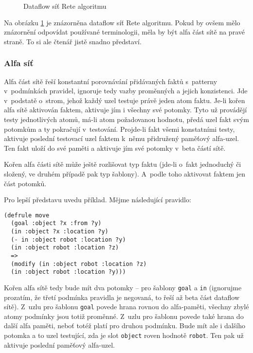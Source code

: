 \begin{figure}[h]
\centerline{}
\caption{Dataflow síť Rete algoritmu\cite{rete}}
\label{network}
\end{figure}

Na obrázku \ref{network} je znázorněna dataflow síť Rete algoritmu.
Pokud by ovšem mělo znázornění odpovídat používané terminologii, měla
by být alfa část sítě na pravé straně. To si ale čtenář jistě snadno
představí.
\subsubsection{Alfa síť}
Alfa část sítě řeší konstantní porovnávání přidávaných faktů s~patterny
v~podmínkách pravidel, ignoruje tedy vazby proměnných a jejich konzistenci.
Jde v~podstatě o~strom, jehož každý uzel testuje právě jeden atom faktu.
Je-li kořen alfa sítě aktivován faktem, aktivuje jím i všechny své potomky.
Tyto už provádějí testy jednotlivých atomů, má-li atom požadovanou hodnotu,
předá uzel fakt svým potomkům a ty pokračují v~testování. Projde-li fakt
všemi konstatními testy, aktivuje poslední testovací uzel faktem k~němu
přidružený paměťový alfa-uzel. Ten fakt uloží do své paměti a aktivuje
jím své potomky v~beta částí sítě.

Kořen alfa části sítě může ještě rozlišovat typ faktu (jde-li o~fakt
jednoduchý či složený, ve druhém případě pak typ šablony). A~podle toho
aktivovat faktem jen část potomků.

Pro lepší představu uvedu příklad. Mějme následující pravidlo:
\begin{verbatim}
(defrule move
  (goal :object ?x :from ?y)
  (in :object ?x :location ?y)
  (- in :object robot :location ?y)
  (in :object robot :location ?z)
  =>
  (modify (in :object robot :location ?z)
  (in :object robot :location ?y)))
\end{verbatim}
Kořen alfa sítě tedy bude mít dva potomky -- pro šablony \verb|goal|
a \verb|in| (ignorujme prozatím, že třetí podmínka pravidla je negovaná,
to řeší až beta část dataflow sítě). Z~uzlu pro šablonu \verb|goal|
povede hrana rovnou do alfa-paměti, všechny zbylé atomy podmínky jsou
totiž proměnné. Z~uzlu pro šablonu povede také hrana do další alfa
paměti, neboť totéž platí pro druhou podmínku. Bude mít ale i dalšího
potomka a to uzel testující, zda je slot \verb|object| roven hodnotě
\verb|robot|. Ten pak už aktivuje poslední paměťový alfa-uzel.

